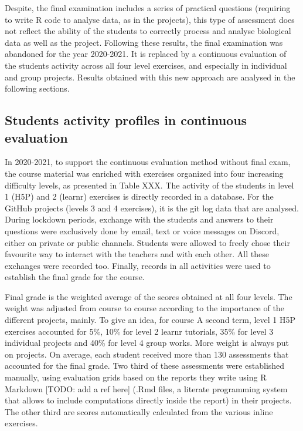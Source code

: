 \documentclass[
]{article}
\begin{document}
Despite, the final examination includes a series of practical questions
(requiring to write R code to analyse data, as in the projects), this
type of assessment does not reflect the ability of the students to
correctly process and analyse biological data as well as the project.
Following these results, the final examination was abandoned for the
year 2020-2021. It is replaced by a continuous evaluation of the
students activity across all four level exercises, and especially in
individual and group projects. Results obtained with this new approach
are analysed in the following sections.

\hypertarget{students-activity-profiles-in-continuous-evaluation}{%
\subsection{Students activity profiles in continuous
evaluation}\label{students-activity-profiles-in-continuous-evaluation}}

In 2020-2021, to support the continuous evaluation method without final
exam, the course material was enriched with exercises organized into
four increasing difficulty levels, as presented in Table XXX. The
activity of the students in level 1 (H5P) and 2 (learnr) exercises is
directly recorded in a database. For the GitHub projects (levels 3 and 4
exercises), it is the git log data that are analysed. During lockdown
periods, exchange with the students and answers to their questions were
exclusively done by email, text or voice messages on Discord, either on
private or public channels. Students were allowed to freely chose their
favourite way to interact with the teachers and with each other. All
these exchanges were recorded too. Finally, records in all activities
were used to establish the final grade for the course.

Final grade is the weighted average of the scores obtained at all four
levels. The weight was adjusted from course to course according to the
importance of the different projects, mainly. To give an idea, for
course A second term, level 1 H5P exercises accounted for 5\%, 10\% for
level 2 learnr tutorials, 35\% for level 3 individual projects and 40\%
for level 4 group works. More weight is always put on projects. On
average, each student received more than 130 assessments that accounted
for the final grade. Two third of these assessments were established
manually, using evaluation grids based on the reports they write using R
Markdown {[}TODO: add a ref here{]} (.Rmd files, a literate programming
system that allows to include computations directly inside the report)
in their projects. The other third are scores automatically calculated
from the various inline exercises.
\end{document}
